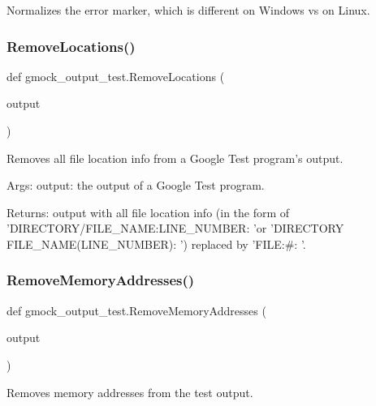 \begin{DoxyVerb}Normalizes the error marker, which is different on Windows vs on Linux.\end{DoxyVerb}
 \mbox{\label{namespacegmock__output__test_aa3c93f8085ff0886bf0d160d71af2452}} 
\subsubsection{\texorpdfstring{RemoveLocations()}{RemoveLocations()}}
{\footnotesize\ttfamily def gmock\+\_\+output\+\_\+test.\+Remove\+Locations (\begin{DoxyParamCaption}\item[{}]{output }\end{DoxyParamCaption})}

\begin{DoxyVerb}Removes all file location info from a Google Test program's output.

Args:
     output:  the output of a Google Test program.

Returns:
     output with all file location info (in the form of
     'DIRECTORY/FILE_NAME:LINE_NUMBER: 'or
     'DIRECTORY\\FILE_NAME(LINE_NUMBER): ') replaced by
     'FILE:#: '.
\end{DoxyVerb}
 \mbox{\label{namespacegmock__output__test_a58b4fdb82b40d01d32b09d4c14ba11a5}} 
\subsubsection{\texorpdfstring{RemoveMemoryAddresses()}{RemoveMemoryAddresses()}}
{\footnotesize\ttfamily def gmock\+\_\+output\+\_\+test.\+Remove\+Memory\+Addresses (\begin{DoxyParamCaption}\item[{}]{output }\end{DoxyParamCaption})}

\begin{DoxyVerb}Removes memory addresses from the test output.\end{DoxyVerb}
 \mbox{\label{namespacegmock__output__test_a2ebfc0abfb0ed307021ecaa9da465c55}} 
